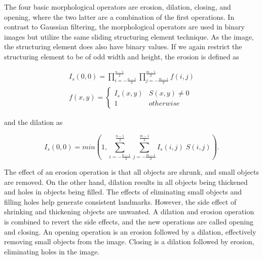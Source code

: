 

The four basic morphological operators are erosion, dilation, closing, and opening, where the two latter are a combination of the first operations. In contrast to Gaussian filtering, the morphological operators are used in binary images but utilize the same sliding structuring element technique. As the image, the structuring element does also have binary values. If we again restrict the structuring element to be of odd width and height, the erosion is defined as 

\begin{equation}
    \begin{split}
        I_s(0,0) = \prod_{i = -\frac{n-1}{2}}^\frac{n-1}{2} \prod_{j = -\frac{m-1}{2}}^\frac{m-1}{2} f(i,j) \\
        f(x,y) = 
        \begin{cases}
        I_s(x,y) & S(x,y) \neq 0 \\
        1 & otherwise
        \end{cases}
    \end{split}
    \label{eq:erosion}
\end{equation}

and the dilation as

\begin{equation}
    I_s(0,0) = min(1, \sum_{i = -\frac{n-1}{2}}^\frac{n-1}{2} \sum_{j = -\frac{m-1}{2}}^\frac{m-1}{2} I_s(i,j) \; S(i,j)).
    \label{eq:dialation}
\end{equation}

The effect of an erosion operation is that all objects are shrunk, and small objects are removed. On the other hand, dilation results in all objects being thickened and holes in objects being filled. The effects of eliminating small objects and filling holes help generate consistent landmarks. However, the side effect of shrinking and thickening objects are unwanted. A dilation and erosion operation is combined to revert the side effects, and the new operations are called opening and closing. An opening operation is an erosion followed by a dilation, effectively removing small objects from the image. Closing is a dilation followed by erosion, eliminating holes in the image. 
